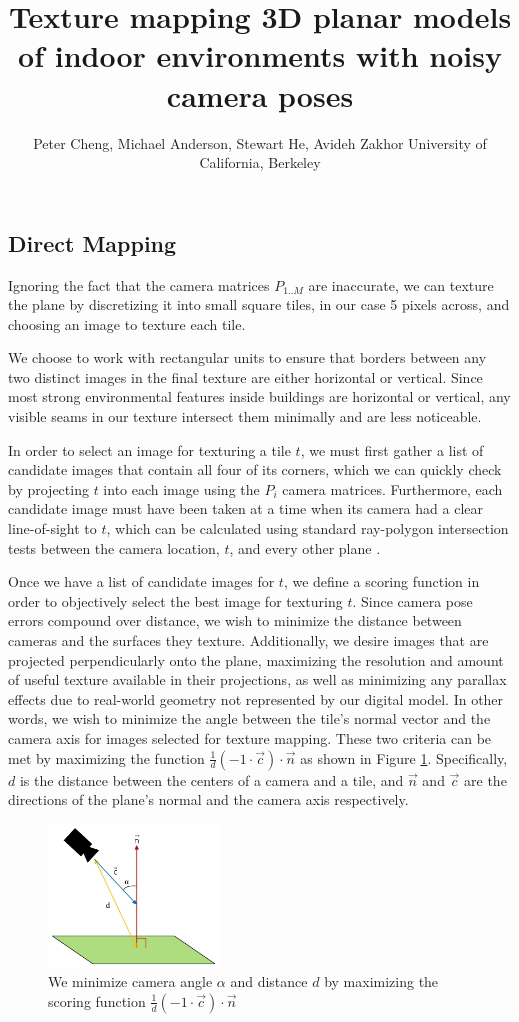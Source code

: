 \documentclass[]{spie}  %
\title{Texture mapping 3D planar models of indoor environments with noisy camera poses}
\author{Peter Cheng, Michael Anderson, Stewart He, Avideh Zakhor
\skiplinehalf
University of California, Berkeley\\
}
\begin{document}
\subsection{Direct Mapping}
\label{sec:directMapping}

Ignoring the fact that the camera matrices $P_{1..M}$ are inaccurate,
we can texture the plane by discretizing it into small square tiles,
in our case 5 pixels across, and choosing an image to texture each
tile.

We choose to work with rectangular units to ensure that borders
between any two distinct images in the final texture are either
horizontal or vertical. Since most strong environmental features
inside buildings are horizontal or vertical, any visible seams in our
texture intersect them minimally and are less noticeable.

In order to select an image for texturing a tile $t$, we must first
gather a list of candidate images that contain all four of its
corners, which we can quickly check by projecting $t$ into each image
using the $P_i$ camera matrices. Furthermore, each candidate image
must have been taken at a time when its camera had a clear
line-of-sight to $t$, which can be calculated using standard
ray-polygon intersection tests between the camera location, $t$, and
every other plane \cite{rayintersection}.

Once we have a list of candidate images for $t$, we define a scoring
function in order to objectively select the best image for texturing
$t$. Since camera pose errors compound over distance, we wish to
minimize the distance between cameras and the surfaces they
texture. Additionally, we desire images that are projected
perpendicularly onto the plane, maximizing the resolution and amount
of useful texture available in their projections, as well as
minimizing any parallax effects due to real-world geometry not
represented by our digital model. In other words, we wish to minimize
the angle between the tile's normal vector and the camera axis for
images selected for texture mapping. These two criteria can be met by
maximizing the function $\frac{1}{d} (-1 \cdot \vec{c}) \cdot \vec{n}$
as shown in Figure \ref{fig:scoringFunction}. Specifically, $d$ is the
distance between the centers of a camera and a tile, and $\vec{n}$ and
$\vec{c}$ are the directions of the plane's normal and the camera axis
respectively.

\begin{figure}
  \centering
  \includegraphics[height=1.5in]{scoringFunction.jpg}
  \caption{We minimize camera angle $\alpha$ and distance $d$ by
    maximizing the scoring function $\frac{1}{d} (-1 \cdot \vec{c})
    \cdot \vec{n}$}
  \label{fig:scoringFunction}
\end{figure}
\end{document}
